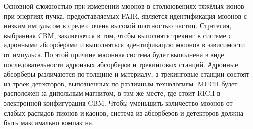 
Основной сложностью при измерении мюонов в столкновениях тяжёлых ионов при энергиях пучка, предоставляемых FAIR, является идентификация мюонов с низким импульсом в среде с очень высокой плотностью частиц. Стратегия, выбранная CBM, заключается в том, чтобы выполнять трекинг в системе с адронными абсорберами и выполняться идентификацию мюонов в зависимости от импульса. По этой причине мюонная система будет выполнена в виде последовательности адронных абсорберов и трекинговых станций. Адронные абсорберы различаются по толщине и материалу, а трекинговые станции состоят из троек детекторов, выполненных по различным технологиям. MUCH будет расположен за дипольным магнитом, в том же месте, где стоит RICH в электронной конфигурации CBM. Чтобы уменьшить количество мюонов от слабых распадов пионов и каонов, система из абсорберов и детекторов должна быть максимально компактна.


